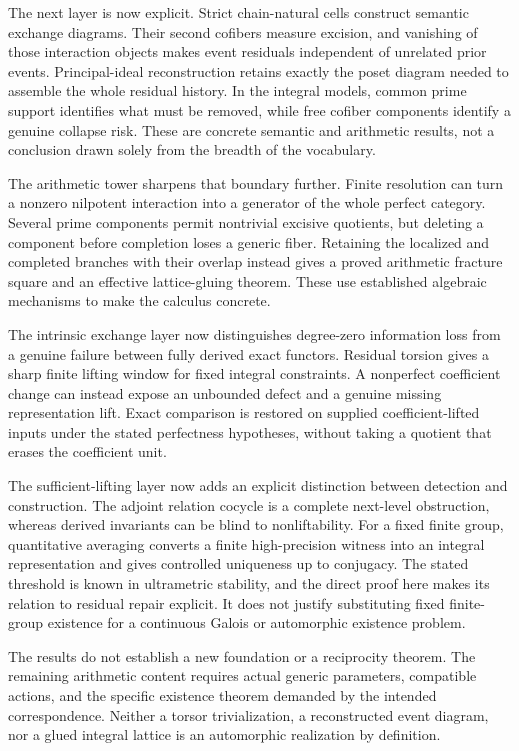 \documentclass[11pt]{article}
\theoremstyle{definition}
\theoremstyle{remark}
\begin{document}
The next layer is now explicit. Strict chain-natural cells construct semantic exchange diagrams. Their second cofibers measure excision, and vanishing of those interaction objects makes event residuals independent of unrelated prior events. Principal-ideal reconstruction retains exactly the poset diagram needed to assemble the whole residual history. In the integral models, common prime support identifies what must be removed, while free cofiber components identify a genuine collapse risk. These are concrete semantic and arithmetic results, not a conclusion drawn solely from the breadth of the vocabulary.

The arithmetic tower sharpens that boundary further. Finite resolution can turn a nonzero nilpotent interaction into a generator of the whole perfect category. Several prime components permit nontrivial excisive quotients, but deleting a component before completion loses a generic fiber. Retaining the localized and completed branches with their overlap instead gives a proved arithmetic fracture square and an effective lattice-gluing theorem. These use established algebraic mechanisms to make the calculus concrete.

The intrinsic exchange layer now distinguishes degree-zero information loss from a genuine failure between fully derived exact functors. Residual torsion gives a sharp finite lifting window for fixed integral constraints. A nonperfect coefficient change can instead expose an unbounded defect and a genuine missing representation lift. Exact comparison is restored on supplied coefficient-lifted inputs under the stated perfectness hypotheses, without taking a quotient that erases the coefficient unit.

The sufficient-lifting layer now adds an explicit distinction between detection and construction. The adjoint relation cocycle is a complete next-level obstruction, whereas derived invariants can be blind to nonliftability. For a fixed finite group, quantitative averaging converts a finite high-precision witness into an integral representation and gives controlled uniqueness up to conjugacy. The stated threshold is known in ultrametric stability, and the direct proof here makes its relation to residual repair explicit. It does not justify substituting fixed finite-group existence for a continuous Galois or automorphic existence problem.

The results do not establish a new foundation or a reciprocity theorem. The remaining arithmetic content requires actual generic parameters, compatible actions, and the specific existence theorem demanded by the intended correspondence. Neither a torsor trivialization, a reconstructed event diagram, nor a glued integral lattice is an automorphic realization by definition.
\end{document}
